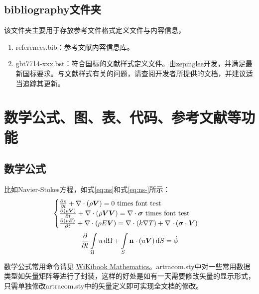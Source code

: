 \subsection{bibliography文件夹}

该文件夹主要用于存放参考文件格式定义文件与内容信息，

\begin{enumerate}
    \item references.bib：参考文献内容信息库。
    \item gbt7714-xxx.bst：符合国标的文献样式定义文件。由\href{https://github.com/zepinglee/gbt7714-bibtex-style}{zepinglee}开发，并满足最新国标要求。与文献样式有关的问题，请查阅开发者所提供的文档，并建议适当追踪其更新。
\end{enumerate}

\section{数学公式、图、表、代码、参考文献等功能}

\subsection{数学公式}

比如Navier-Stokes方程，如式\eqref{eq:ns}和式\eqref{eq:ns-}所示：
\begin{equation} \label{eq:ns}
    \begin{cases}
        \frac{\partial \rho}{\partial t} + \nabla\cdot(\rho\Vector{V}) = 0 \ \mathrm{times\ font\ test}\\
        \frac{\partial (\rho\Vector{V})}{\partial t} + \nabla\cdot(\rho\Vector{V}\Vector{V}) = \nabla\cdot\Tensor{\sigma} \ \text{times font test}\\
        \frac{\partial (\rho E)}{\partial t} + \nabla\cdot(\rho E\Vector{V}) = \nabla\cdot(k\nabla T) + \nabla\cdot(\Tensor{\sigma}\cdot\Vector{V})
    \end{cases}
\end{equation}
\begin{equation} \label{eq:ns-}
    \frac{\partial }{\partial t}\int\limits_{\Omega} u \, \mathrm{d}\Omega + \int\limits_{S} \boldsymbol{\mathbf{n}}\cdot(u\boldsymbol{V}) \, \mathrm{d}S = \dot{\phi}
\end{equation}

数学公式常用命令请见 \href{https://en.wikibooks.org/wiki/LaTeX/Mathematics}{WiKibook Mathematics}。artracom.sty中对一些常用数据类型如矢量矩阵等进行了封装，这样的好处是如有一天需要修改矢量的显示形式，只需单独修改artracom.sty中的矢量定义即可实现全文档的修改。

